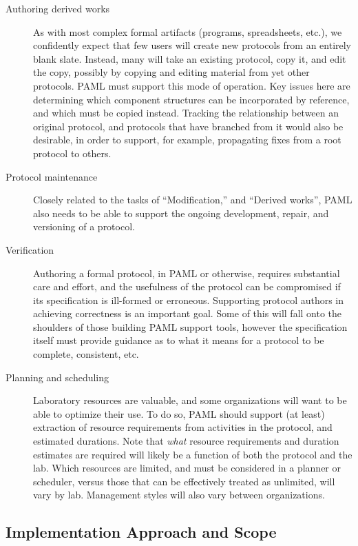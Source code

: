 \begin{description}
\item[Authoring derived works] As with most complex formal artifacts (programs, spreadsheets, etc.), we confidently expect that few users will create new protocols from an entirely blank slate.  
Instead, many will take an existing protocol, copy it, and edit the copy, possibly by copying and editing material from yet other protocols.  PAML must support this mode of operation.  
Key issues here are determining which component structures can be incorporated by reference, and which must be copied instead.  Tracking the relationship between an original protocol, and protocols that have branched from it would also be desirable, in order to support, for example, propagating fixes from a root protocol to others.

\item[Protocol maintenance] Closely related to the tasks of ``Modification,'' and ``Derived works'', PAML also needs to be able to support the ongoing development, repair, and versioning of a protocol.

\item[Verification] Authoring a formal protocol, in PAML or otherwise, requires substantial care and effort, and the usefulness of the protocol can be compromised if its specification is ill-formed or erroneous.  
Supporting protocol authors in achieving correctness is an important goal. 
Some of this will fall onto the shoulders of those building PAML support tools, however the specification itself must provide guidance as to what it means for a protocol to be complete, consistent, etc.

\item[Planning and scheduling] Laboratory resources are valuable, and some organizations will want to be able to optimize their use. 
To do so, PAML should support (at least) extraction of resource requirements from activities in the protocol, and estimated durations.  Note that \emph{what} resource requirements and duration estimates are required will likely be a function of both the protocol and the lab.  
Which resources are limited, and must be considered in a planner or scheduler, versus those that can be effectively treated as unlimited, will vary by lab.  Management styles will also vary between organizations.

\end{description}

\subsection{Implementation Approach and Scope}

